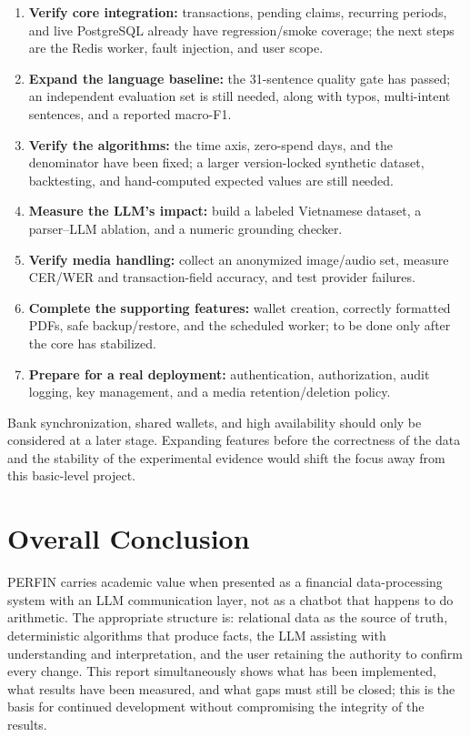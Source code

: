 \begin{enumerate}
  \item \textbf{Verify core integration:} transactions, pending claims, recurring periods, and live PostgreSQL already have regression/smoke coverage; the next steps are the Redis worker, fault injection, and user scope.
  \item \textbf{Expand the language baseline:} the 31-sentence quality gate has passed; an independent evaluation set is still needed, along with typos, multi-intent sentences, and a reported macro-F1.
  \item \textbf{Verify the algorithms:} the time axis, zero-spend days, and the denominator have been fixed; a larger version-locked synthetic dataset, backtesting, and hand-computed expected values are still needed.
  \item \textbf{Measure the LLM's impact:} build a labeled Vietnamese dataset, a parser--LLM ablation, and a numeric grounding checker.
  \item \textbf{Verify media handling:} collect an anonymized image/audio set, measure CER/WER and transaction-field accuracy, and test provider failures.
  \item \textbf{Complete the supporting features:} wallet creation, correctly formatted PDFs, safe backup/restore, and the scheduled worker; to be done only after the core has stabilized.
  \item \textbf{Prepare for a real deployment:} authentication, authorization, audit logging, key management, and a media retention/deletion policy.
\end{enumerate}

Bank synchronization, shared wallets, and high availability should only be considered at a later stage. Expanding features before the correctness of the data and the stability of the experimental evidence would shift the focus away from this basic-level project.

\section{Overall Conclusion}

PERFIN carries academic value when presented as a financial data-processing system with an LLM communication layer, not as a chatbot that happens to do arithmetic. The appropriate structure is: relational data as the source of truth, deterministic algorithms that produce facts, the LLM assisting with understanding and interpretation, and the user retaining the authority to confirm every change. This report simultaneously shows what has been implemented, what results have been measured, and what gaps must still be closed; this is the basis for continued development without compromising the integrity of the results.

